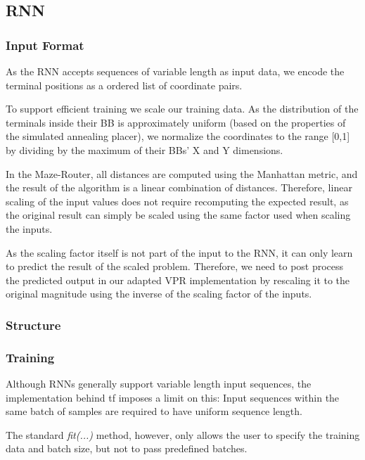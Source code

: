 \subsection{\gls{RNN}}

\subsubsection{Input Format}

As the \gls{RNN} accepts sequences of variable length as input data, we encode the terminal positions as a ordered list of coordinate pairs.

To support efficient training we scale our training data. As the distribution of the terminals inside their \gls{BB} is approximately uniform (based on the properties of the simulated annealing placer), we normalize the coordinates to the range [0,1] by dividing by the maximum of their \glspl{BB}' X and Y dimensions. 

In the Maze-Router, all distances are computed using the Manhattan metric, and the result of the algorithm is a linear combination of distances. Therefore, linear scaling of the input values does not require recomputing the expected result, as the original result can simply be scaled using the same factor used when scaling the inputs.

As the scaling factor itself is not part of the input to the \gls{RNN}, it can only learn to predict the result of the scaled problem. Therefore, we need to post process the predicted output in our adapted \gls{VPR} implementation by rescaling it to the original magnitude using the inverse of the scaling factor of the inputs.

\subsubsection{Structure}

\subsubsection{Training}

Although \glspl{RNN} generally support variable length input sequences, the implementation behind \gls{tf} imposes a limit on this: Input sequences within the same batch of samples are required to have uniform sequence length.

The standard \textit{fit(...)} method, however, only allows the user to specify the training data and batch size, but not to pass predefined batches.

